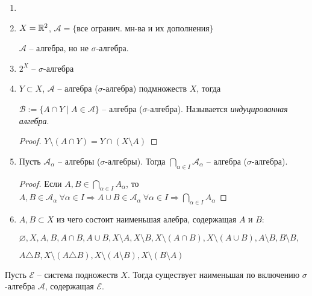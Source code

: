 \begin{example} 
    \begin{enumerate}
        \item[]
        \item $X=\mathbb{R}^2$, $\mathcal{A} = \{\text{все огранич. мн-ва и их дополнения}\}$
        
        $\mathcal{A}$ – алгебра, но не $\sigma$-алгебра.

        \item $2^X$ – $\sigma$-алгебра
        
        \item $Y\subset X$, $\mathcal{A}$ – алгебра ($\sigma$-алгебра) подмножеств $X$, тогда
        
        $\mathcal{B} := \{ A\cap Y \mid A\in \mathcal{A}\}$ – алгебра ($\sigma$-алгебра). Называется \textit{индуцированная алгебра}.

        \begin{proof}
            $Y \setminus (A\cap Y) = Y \cap (X \setminus A)$
        \end{proof}

        \item Пусть $\mathcal{A}_\alpha$ – алгебры ($\sigma$-алгебры). Тогда $\bigcap\limits_{\alpha \in I} \mathcal{A}_\alpha$ – алгебра ($\sigma$-алгебра).
        
        \begin{proof}
            Если $A, B\in \bigcap\limits_{\alpha \in I} A_\alpha$, то $A, B\in \mathcal{A}_\alpha\ \forall \alpha \in I\Rightarrow A\cup B \in \mathcal{A}_\alpha\ \forall \alpha \in I\Rightarrow \bigcap\limits_{\alpha \in I} A_\alpha$
        \end{proof}

        \item $A, B\subset X$ из чего состоит наименьшая алебра, содержащая $A$ и $B$:
        
        $\varnothing, X, A, B, A\cap B, A \cup B, X \setminus A,  X \setminus B,  X \setminus (A\cap B),  X \setminus (A\cup B), A\setminus B, B\setminus B,$
        
        $A\triangle B, X \setminus (A\triangle B), X\setminus (A\setminus B), X\setminus (B\setminus A)$
    \end{enumerate}
\end{example}

\begin{theorem}
    Пусть $\mathcal{E}$ – система подножеств $X$. Тогда существует наименьшая по включению $\sigma$-алгебра $\mathcal{A}$,
    содержащая $\mathcal{E}$.
\end{theorem}

